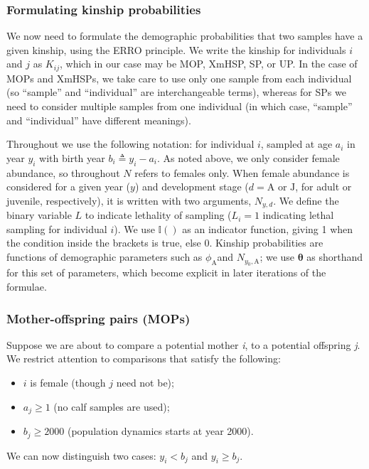 \subsubsection{Formulating kinship probabilities}

We now need to formulate the demographic probabilities that two samples
have a given kinship, using the ERRO principle. We write the kinship
for individuals $i$ and $j$ as $K_{ij}$, which in our case may
be MOP, XmHSP, SP, or UP. In the case of MOPs and XmHSPs, we take
care to use only one sample from each individual (so ``sample''
and ``individual'' are interchangeable terms), whereas for SPs we
need to consider multiple samples from one individual (in which case,
``sample'' and ``individual'' have different meanings).

Throughout we use the following notation: for individual \emph{$i$},
sampled at age $a_{i}$ in year $y_{i}$ with birth year $b_{i}\triangleq y_{i}-a_{i}$.
As noted above, we only consider female abundance, so throughout $N$
refers to females only. When female abundance is considered for a
given year ($y$) and development stage ($d=\text{A}$ or $\text{J}$,
for adult or juvenile, respectively), it is written with two arguments,
$N_{y,d}$. We define the binary variable $L$ to indicate lethality
of sampling ($L_{i}=1$ indicating lethal sampling for individual
$i$). We use $\mathbb{I}()$ as an indicator function, giving 1 when
the condition inside the brackets is true, else 0. Kinship probabilities
are functions of demographic parameters such as $\phi_{\text{A}}$and
$N_{y_{0},\text{A}}$; we use $\boldsymbol{\theta}$ as shorthand
for this set of parameters, which become explicit in later iterations
of the formulae.

\subsubsection{Mother-offspring pairs (MOPs)}

Suppose we are about to compare a potential mother \emph{i}, to a
potential offspring \emph{j}. We restrict attention to comparisons
that satisfy the following:
\begin{itemize}
\item \emph{$i$} is female (though \emph{$j$} need not be);
\item $a_{j}\geqslant1$ (no calf samples are used);
\item $b_{j}\geqslant2000$ (population dynamics starts at year 2000).
\end{itemize}
We can now distinguish two cases: $y_{i}<b_{j}$ and $y_{i}\geqslant b_{j}$.

